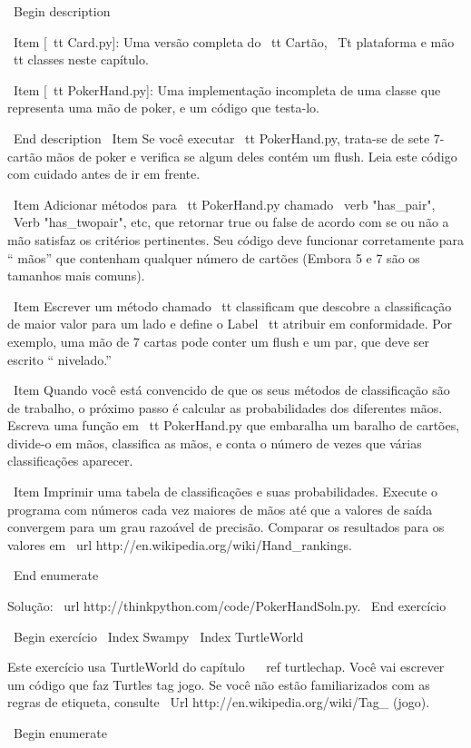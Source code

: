 \documentclass[10pt]{book}
\begin{document}
{{{{{{{{{{{{{{{{{\ Begin {description}

\ Item [{\ tt Card.py}]: Uma versão completa do {\ tt Cartão},
{\ Tt plataforma} e {mão \ tt} classes neste capítulo.

\ Item [{\ tt PokerHand.py}]: Uma implementação incompleta de uma classe
que representa uma mão de poker, e um código que testa-lo.

\ End {description}
%
\ Item Se você executar {\ tt PokerHand.py}, trata-se de sete 7-cartão mãos de poker
e verifica se algum deles contém um flush. Leia este
código com cuidado antes de ir em frente.

\ Item Adicionar métodos para {\ tt PokerHand.py} chamado \ verb "has_pair",
\ Verb "has_twopair", etc, que retornar true ou false de acordo com
se ou não a mão satisfaz os critérios pertinentes. Seu código deve
funcionar corretamente para `` mãos'' que contenham qualquer número de cartões
(Embora 5 e 7 são os tamanhos mais comuns).

\ Item Escrever um método chamado {\ tt classificam} que descobre
a classificação de maior valor para um lado e define o
{Label \ tt} atribuir em conformidade. Por exemplo, uma mão de 7 cartas
pode conter um flush e um par, que deve ser escrito `` nivelado.''

\ Item Quando você está convencido de que os seus métodos de classificação são
de trabalho, o próximo passo é calcular as probabilidades dos diferentes
mãos. Escreva uma função em {\ tt PokerHand.py} que embaralha um baralho de
cartões, divide-o em mãos, classifica as mãos, e conta o
número de vezes que várias classificações aparecer.

\ Item Imprimir uma tabela de classificações e suas probabilidades.
Execute o programa com números cada vez maiores de mãos até que a
valores de saída convergem para um grau razoável de precisão. Comparar
os resultados para os valores em \ url {http://en.wikipedia.org/wiki/Hand_rankings}.

\ End {enumerate}

Solução: \ url {http://thinkpython.com/code/PokerHandSoln.py}.
\ End {} exercício


\ Begin {} exercício
\ Index {} Swampy
\ Index {} TurtleWorld

Este exercício usa TurtleWorld do capítulo ~ \ ref {} turtlechap.
Você vai escrever um código que faz Turtles tag jogo. Se você
não estão familiarizados com as regras de etiqueta, consulte
\ Url {http://en.wikipedia.org/wiki/Tag_ (jogo)}.

\ Begin {enumerate}

}}}}}}}}}}}}}}}}}
\end{document}
